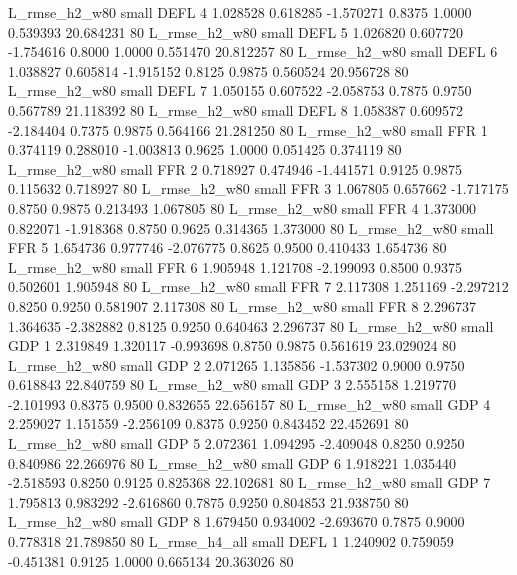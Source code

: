  L_rmse_h2_w80      small     DEFL                 4 1.028528 0.618285 -1.570271 0.8375 1.0000  0.539393   20.684231 80
 L_rmse_h2_w80      small     DEFL                 5 1.026820 0.607720 -1.754616 0.8000 1.0000  0.551470   20.812257 80
 L_rmse_h2_w80      small     DEFL                 6 1.038827 0.605814 -1.915152 0.8125 0.9875  0.560524   20.956728 80
 L_rmse_h2_w80      small     DEFL                 7 1.050155 0.607522 -2.058753 0.7875 0.9750  0.567789   21.118392 80
 L_rmse_h2_w80      small     DEFL                 8 1.058387 0.609572 -2.184404 0.7375 0.9875  0.564166   21.281250 80
 L_rmse_h2_w80      small      FFR                 1 0.374119 0.288010 -1.003813 0.9625 1.0000  0.051425    0.374119 80
 L_rmse_h2_w80      small      FFR                 2 0.718927 0.474946 -1.441571 0.9125 0.9875  0.115632    0.718927 80
 L_rmse_h2_w80      small      FFR                 3 1.067805 0.657662 -1.717175 0.8750 0.9875  0.213493    1.067805 80
 L_rmse_h2_w80      small      FFR                 4 1.373000 0.822071 -1.918368 0.8750 0.9625  0.314365    1.373000 80
 L_rmse_h2_w80      small      FFR                 5 1.654736 0.977746 -2.076775 0.8625 0.9500  0.410433    1.654736 80
 L_rmse_h2_w80      small      FFR                 6 1.905948 1.121708 -2.199093 0.8500 0.9375  0.502601    1.905948 80
 L_rmse_h2_w80      small      FFR                 7 2.117308 1.251169 -2.297212 0.8250 0.9250  0.581907    2.117308 80
 L_rmse_h2_w80      small      FFR                 8 2.296737 1.364635 -2.382882 0.8125 0.9250  0.640463    2.296737 80
 L_rmse_h2_w80      small      GDP                 1 2.319849 1.320117 -0.993698 0.8750 0.9875  0.561619   23.029024 80
 L_rmse_h2_w80      small      GDP                 2 2.071265 1.135856 -1.537302 0.9000 0.9750  0.618843   22.840759 80
 L_rmse_h2_w80      small      GDP                 3 2.555158 1.219770 -2.101993 0.8375 0.9500  0.832655   22.656157 80
 L_rmse_h2_w80      small      GDP                 4 2.259027 1.151559 -2.256109 0.8375 0.9250  0.843452   22.452691 80
 L_rmse_h2_w80      small      GDP                 5 2.072361 1.094295 -2.409048 0.8250 0.9250  0.840986   22.266976 80
 L_rmse_h2_w80      small      GDP                 6 1.918221 1.035440 -2.518593 0.8250 0.9125  0.825368   22.102681 80
 L_rmse_h2_w80      small      GDP                 7 1.795813 0.983292 -2.616860 0.7875 0.9250  0.804853   21.938750 80
 L_rmse_h2_w80      small      GDP                 8 1.679450 0.934002 -2.693670 0.7875 0.9000  0.778318   21.789850 80
 L_rmse_h4_all      small     DEFL                 1 1.240902 0.759059 -0.451381 0.9125 1.0000  0.665134   20.363026 80
